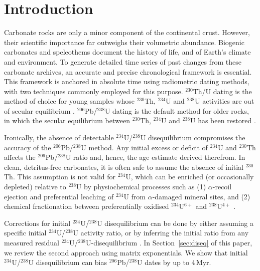 \documentclass{article}
\begin{document}

\section{Introduction}\label{sec:intro}

Carbonate rocks are only a minor component of the continental
crust. However, their scientific importance far outweighs their
volumetric abundance. Biogenic carbonates and speleothems document the
history of life, and of Earth's climate and environment. To generate
detailed time series of past changes from these carbonate archives, an
accurate and precise chronological framework is essential. This
framework is anchored in absolute time using radiometric dating
methods, with two techniques commonly employed for this
purpose. ${}^{230}$Th/U dating is the method of choice for young
samples whose ${}^{230}$Th, ${}^{234}$U and ${}^{238}$U activities are
out of secular equilibrium \citep{kaufman1965,
  ludwig2003b}. ${}^{206}$Pb/${}^{238}$U dating is the default method
for older rocks, in which the secular equilibrium between
${}^{230}$Th, ${}^{234}$U and ${}^{238}$U has been restored
\citep{smith1989, roberts2020}.\medskip

Ironically, the absence of detectable ${}^{234}$U/${}^{238}$U
disequilibrium compromises the accuracy of the
${}^{206}$Pb/${}^{238}$U method. Any initial excess or deficit of
${}^{234}$U and ${}^{230}$Th affects the ${}^{206}$Pb/${}^{238}$U
ratio and, hence, the age estimate derived therefrom. In clean,
detritus-free carbonates, it is often safe to assume the absence of
initial ${}^{230}$Th. This assumption is not valid for ${}^{234}$U,
which can be enriched (or occasionally depleted) relative to
${}^{238}$U by physiochemical processes such as (1) $\alpha$-recoil
ejection and preferential leaching of ${}^{234}$U from
$\alpha$-damaged mineral sites, and (2) chemical fractionation between
preferentially oxidised ${}^{234}$U$^{6+}$ and ${}^{238}$U$^{4+}$
\citep{fleischer1982,porcelli2003}.\medskip

Corrections for initial ${}^{234}$U/${}^{238}$U disequilibrium can be
done by either assuming a specific initial ${}^{234}$U/${}^{238}$U
activity ratio, or by inferring the initial ratio from any measured
residual ${}^{234}$U/${}^{238}$U-disequilibrium \citep{richards1998,
  woodhead2006, wendt1985, engel2019}.  In Section~\ref{sec:diseq} of
this paper, we review the second approach using matrix
exponentials. We show that initial ${}^{234}$U/${}^{238}$U
disequilibrium can bias ${}^{206}$Pb/${}^{238}$U dates by up to
4\,Myr.\medskip
\end{document}
